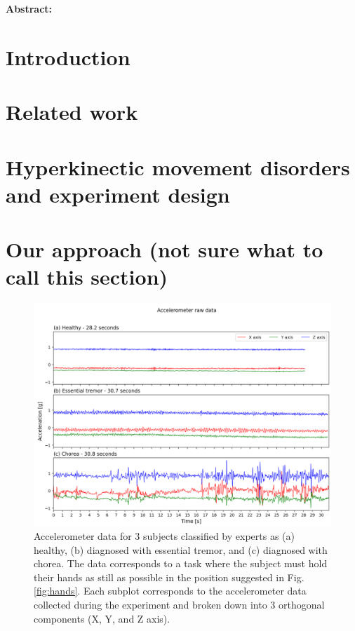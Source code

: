 
\noindent \textbf{Abstract:}

\section{Introduction}

\section{Related work}

\section{Hyperkinectic movement disorders and experiment design}

\section{Our approach (not sure what to call this section)}


\begin{figure}[ht]
\centering
\includegraphics[width=\linewidth]{figures/nemo/acc2.png}
\caption{Accelerometer data for 3 subjects classified by experts as (a) healthy, (b) diagnosed with essential tremor, and (c) diagnosed with chorea. The data corresponds to a task where the subject must hold their hands as still as possible in the position suggested in Fig. \ref{fig:hands}.
Each subplot corresponds to the accelerometer data collected during the experiment and broken down into 3 orthogonal components (X, Y, and Z axis). }
\label{fig:acc}
\end{figure}

